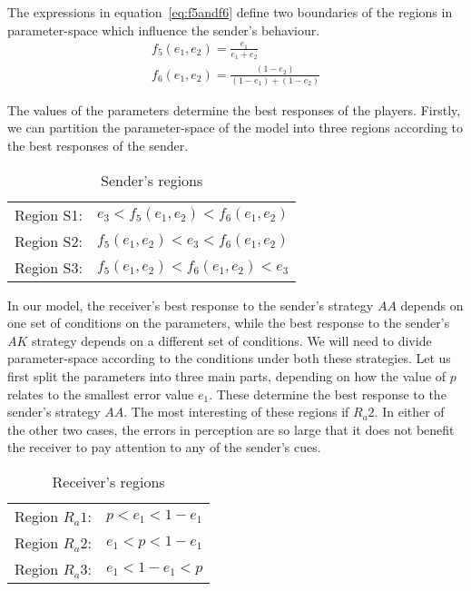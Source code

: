 \documentclass[a4paper,12pt]{article}
\numberwithin{equation}{section}
\begin{document}
The expressions in equation~\ref{eq:f5andf6} define two boundaries of the regions in parameter-space which influence the sender's behaviour.
\begin{subequations}
\label{eq:f5andf6}
\begin{gather}
f_{5}(e_{1},e_{2})=\frac{e_{1}}{e_{1}+e_{2}}\\
f_{6}(e_{1},e_{2})=\frac{(1-e_{2})}{(1-e_{1})+(1-e_{2})}
\end{gather}
\end{subequations}

The values of the parameters determine the best responses of the players. Firstly, we can partition the parameter-space of the model into three regions according to the best responses of the sender.

\begin{table}[h]
\begin{center}
\begin{tabular}{lc}
Region S1: & $e_{3}<f_{5}(e_{1},e_{2})<f_{6}(e_{1},e_{2})$\\
Region S2: & $f_{5}(e_{1},e_{2})<e_{3}<f_{6}(e_{1},e_{2})$\\
Region S3: & $f_{5}(e_{1},e_{2})<f_{6}(e_{1},e_{2})<e_{3}$
\end{tabular}
\end{center}
\caption{Sender's regions}
\label{tab:CueGamewithObservableAmplification/RegionsS}
\end{table}

In our model, the receiver's best response to the sender's strategy $AA$ depends on one set of conditions on the parameters, while the best response to the sender's $AK$ strategy depends on a different set of conditions. We will need to divide parameter-space according to the conditions under both these strategies. Let us first split the parameters into three main parts, depending on how the value of $p$ relates to the smallest error value $e_{1}$. These determine the best response to the sender's strategy $AA$. The most interesting of these regions if $R_{a}2$. In either of the other two cases, the errors in perception are so large that it does not benefit the receiver to pay attention to any of the sender's cues.

\begin{table}[h]
\begin{center}
\begin{tabular}{lc}
Region $R_{a}1$: & $p<e_{1}<1-e_{1}$\\
Region $R_{a}2$: & $e_{1}<p<1-e_{1}$\\
Region $R_{a}3$: & $e_{1}<1-e_{1}<p$
\end{tabular}
\end{center}
\caption{Receiver's regions}
\label{tab:CueGamewithObservableAmplification/RegionsRa}
\end{table}
\end{document}
